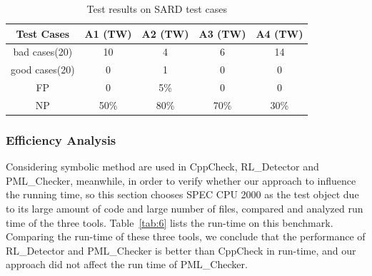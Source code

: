 \begin{table}[!h]
\center
\caption{Test results on SARD test cases}\label{tab:7}
\begin{tabular}{|c|c|c|c|c|}
\hline
\textbf{Test Cases} & \textbf{A1} (TW)& \textbf{A2} (TW) & \textbf{A3} (TW) & \textbf{A4} (TW)\\
\hline
bad cases(20) &10 & 4 & 6 & 14\\
\hline
good cases(20) & 0 & 	1 &	0 &	0\\
\hline
FP & 0& 5\% & 0 & 0\\
\hline
NP & 50\% & 80\% & 70\% & 30\%\\
\hline
\end{tabular}
\end{table}


\subsubsection{Efficiency Analysis} 

Considering symbolic method are used in CppCheck, RL\_Detector and PML\_Checker, meanwhile, in order to verify whether our approach to influence the running time, so this section chooses SPEC CPU 2000 as the test object due to its large amount of code and large number of files, compared and analyzed run time of the three tools.  Table~\ref{tab:6} lists the run-time on this benchmark. Comparing the run-time of these three tools, we conclude that the performance of RL\_Detector and PML\_Checker is better than CppCheck in run-time, and our approach did not affect the run time of PML\_Checker.

